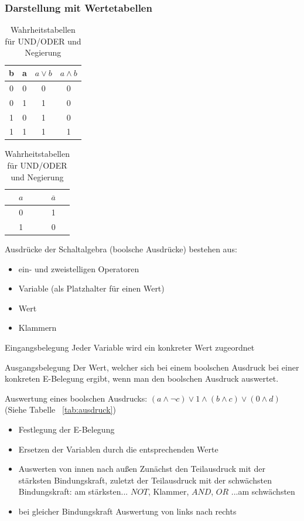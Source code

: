 \documentclass[10pt,a4paper]{scrartcl}
\newcommand{\reftbl}[1]{Tabelle ~\ref{#1}}
\begin{document}
\subsubsection{Darstellung mit Wertetabellen}
\begin{table}[h]
	\centering
	\begin{minipage}[b]{0.4\textwidth}
		\centering
		\begin{tabular}{cc|c|c}
			b & a & $a \vee b$ & $a \wedge b$\\ \hline
			0 & 0 & 0 & 0\\
			0 & 1 & 1 & 0\\
			1 & 0 & 1 & 0\\
			1 & 1 & 1 & 1\\
		\end{tabular}
	\end{minipage}
	\begin{minipage}[b]{0.4\textwidth}
		\centering
		\begin{tabular}{c|c}
			$a$ & $\overline{a}$\\ \hline
			0 & 1\\
			1 & 0\\
		\end{tabular}
	\end{minipage}	
	\caption{Wahrheitstabellen für UND/ODER und Negierung}
\end{table}

Ausdrücke der Schaltalgebra (\glqq boolsche Ausdrücke\grqq) bestehen aus:
\begin{itemize}
	\item ein- und zweistelligen Operatoren
	\item Variable (als Platzhalter für einen Wert)
	\item Wert
	\item Klammern
\end{itemize}
\begin{Theorem}{Eingangsbelegung}{}
	Jeder Variable wird ein konkreter Wert zugeordnet
\end{Theorem}
\begin{Theorem}{Ausgangsbelegung}{}
	Der Wert, welcher sich bei einem boolschen Ausdruck bei einer konkreten E-Belegung ergibt, wenn man den boolschen Ausdruck \glqq auswertet\grqq.
\end{Theorem}

Auswertung eines boolschen Ausdrucks: $(a \wedge \neg c) \vee 1 \wedge(b \wedge c) \vee (0 \wedge d)$ (Siehe \reftbl{tab:ausdruck})
\begin{itemize}
	\item Festlegung der E-Belegung
	\item Ersetzen der Variablen durch die entsprechenden Werte
	\item Auswerten \glqq von innen nach außen\grqq
	\subitem Zunächst den Teilausdruck mit der stärksten Bindungskraft, zuletzt der Teilausdruck mit der schwächsten\\ Bindungskraft: am stärksten... $NOT$, Klammer, $AND$, $OR$ ...am schwächsten
	\item bei gleicher Bindungskraft Auswertung von links nach rechts
\end{itemize}
\end{document}
